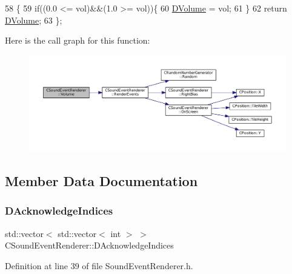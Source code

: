 \begin{DoxyCode}
58                              \{
59             \textcolor{keywordflow}{if}((0.0 <= vol)&&(1.0 >= vol))\{
60                 \hyperlink{classCSoundEventRenderer_a3812aeb93aef90635a7da72fc101c686}{DVolume} = vol;   
61             \}
62             \textcolor{keywordflow}{return} \hyperlink{classCSoundEventRenderer_a3812aeb93aef90635a7da72fc101c686}{DVolume};
63         \};
\end{DoxyCode}
Here is the call graph for this function\+:\nopagebreak
\begin{figure}[H]
\begin{center}
\leavevmode
\includegraphics[width=350pt]{classCSoundEventRenderer_a7266c3416291f3802d6f3476a29285a2_cgraph}
\end{center}
\end{figure}


\subsection{Member Data Documentation}
\hypertarget{classCSoundEventRenderer_ad52a927e172ab9a00dbf1f707e1fb724}{}\label{classCSoundEventRenderer_ad52a927e172ab9a00dbf1f707e1fb724} 
\subsubsection{\texorpdfstring{D\+Acknowledge\+Indices}{DAcknowledgeIndices}}
{\footnotesize\ttfamily std\+::vector$<$ std\+::vector$<$ int $>$ $>$ C\+Sound\+Event\+Renderer\+::\+D\+Acknowledge\+Indices\hspace{0.3cm}{\ttfamily [protected]}}



Definition at line 39 of file Sound\+Event\+Renderer.\+h.

\hypertarget{classCSoundEventRenderer_a5ffc7dd4911c09c23987c6d1a8776c26}{}\label{classCSoundEventRenderer_a5ffc7dd4911c09c23987c6d1a8776c26} 
